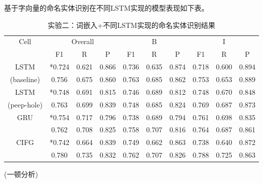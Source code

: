 基于字向量的命名实体识别在不同LSTM实现的模型表现如下表。
\begin{table}[H]
    \centering
    \caption{实验二：词嵌入+不同LSTM实现的命名实体识别结果}
    \begin{tabular}{cccccccccc}
        \toprule
            \multirow{2}{*}{Cell} &\multicolumn{3}{c}{Overall} &\multicolumn{3}{c}{B} &\multicolumn{3}{c}{I}\\
            \cmidrule(lr){2-4} \cmidrule(lr){5-7} \cmidrule(lr){8-10}
            & F1 & R & P & F1 & R & P & F1 & R & P\\
        \midrule
            LSTM & *0.724 & 0.621 & 0.866 & 0.736 & 0.635 & 0.874 & 0.718 & 0.600 & 0.894\\
            (baseline) & 0.756 & 0.675 & 0.860 & 0.763 & 0.685 & 0.862 & 0.753 & 0.653 & 0.889\\
            LSTM & *0.748 & 0.691 & 0.815 & 0.746 & 0.689 & 0.812 & 0.748 & 0.670 & 0.848\\
            (peep-hole) & 0.763 & 0.699 & 0.839 & 0.748 & 0.685 & 0.824 & 0.769 & 0.687 & 0.873\\
            \multirow{2}{2cm}{GRU} & *0.754 & 0.717 & 0.796 & 0.738 & 0.689 & 0.794 & 0.761 & 0.698 & 0.835\\
                                 & 0.762 & 0.708 & 0.825 & 0.758 & 0.707 & 0.816 & 0.764 & 0.687 & 0.861\\
            \multirow{2}{2cm}{CIFG} & *0.742 & 0.664 & 0.839 & 0.749 & 0.662 & 0.863 & 0.738 & 0.640 & 0.872\\
                                  & 0.780 & 0.735 & 0.832 & 0.762 & 0.707 & 0.826 & 0.788 & 0.725 & 0.863\\
        \bottomrule
    \end{tabular}
    \label{tab:tab1}
\end{table}
(一顿分析)

